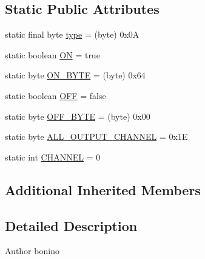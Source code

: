 \subsection*{Static Public Attributes}
\begin{DoxyCompactItemize}
\item 
static final byte \hyperlink{classit_1_1polito_1_1elite_1_1enocean_1_1enj_1_1eep_1_1eep26_1_1_d2_1_1_d201_1_1_d2010_a_aaa6d4f10ff2d81d26f411e76459ff48e}{type} = (byte) 0x0A
\item 
static boolean \hyperlink{classit_1_1polito_1_1elite_1_1enocean_1_1enj_1_1eep_1_1eep26_1_1_d2_1_1_d201_1_1_d2010_a_a84c262a14470dffaaf2eabcf0fb5134e}{ON} = true
\item 
static byte \hyperlink{classit_1_1polito_1_1elite_1_1enocean_1_1enj_1_1eep_1_1eep26_1_1_d2_1_1_d201_1_1_d2010_a_ae5f926a756115c018d4f383b0f7ebd1d}{O\+N\+\_\+\+B\+Y\+TE} = (byte) 0x64
\item 
static boolean \hyperlink{classit_1_1polito_1_1elite_1_1enocean_1_1enj_1_1eep_1_1eep26_1_1_d2_1_1_d201_1_1_d2010_a_abb5c476537841cc9ecb065290afeb0eb}{O\+FF} = false
\item 
static byte \hyperlink{classit_1_1polito_1_1elite_1_1enocean_1_1enj_1_1eep_1_1eep26_1_1_d2_1_1_d201_1_1_d2010_a_af4fa9947d38d817af9aa3b70dc402080}{O\+F\+F\+\_\+\+B\+Y\+TE} = (byte) 0x00
\item 
static byte \hyperlink{classit_1_1polito_1_1elite_1_1enocean_1_1enj_1_1eep_1_1eep26_1_1_d2_1_1_d201_1_1_d2010_a_a8cf19d2539dd07ba9890690690f94063}{A\+L\+L\+\_\+\+O\+U\+T\+P\+U\+T\+\_\+\+C\+H\+A\+N\+N\+EL} = 0x1E
\item 
static int \hyperlink{classit_1_1polito_1_1elite_1_1enocean_1_1enj_1_1eep_1_1eep26_1_1_d2_1_1_d201_1_1_d2010_a_a108b0e1544f2e49b809d4d1a19b6764b}{C\+H\+A\+N\+N\+EL} = 0
\end{DoxyCompactItemize}
\subsection*{Additional Inherited Members}


\subsection{Detailed Description}
\begin{DoxyAuthor}{Author}
bonino 
\end{DoxyAuthor}


